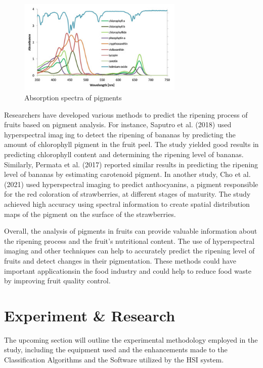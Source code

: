 \documentclass{article}
\begin{document}
{            \begin{figure}[h]
                \centering
                \includegraphics[width=0.7\textwidth]{Figures/pigmentWav.PNG}
                \caption{ Absorption spectra of pigments}
                \label{fig:my_label}
            \end{figure}
            
            \vspace*{1\baselineskip}
            Researchers have developed various methods to predict the ripening process of fruits based on pigment analysis. For instance, Saputro et al. (2018) used hyperspectral imaging to detect the ripening of bananas by predicting the amount of chlorophyll pigment in the fruit peel. The study yielded good results in predicting chlorophyll content and determining the ripening level of bananas. Similarly, Permata et al. (2017) reported similar results in predicting the ripening level of bananas by estimating carotenoid pigment. In another study, Cho et al. (2021) used hyperspectral imaging to predict anthocyanins, a pigment responsible for the red coloration of strawberries, at different stages of maturity. The study achieved high accuracy using spectral information to create spatial distribution maps of the pigment on the surface of the strawberries.\par
            Overall, the analysis of pigments in fruits can provide valuable information about the ripening process and the fruit’s nutritional content. The use of hyperspectral imaging and other techniques can help to accurately predict the ripening level of fruits and detect changes in their pigmentation. These methods could have important applicationsin the food industry and could help to reduce food waste by improving fruit quality control.
            \newpage
        \section{Experiment \& Research}
            \setcounter{figure}{0}
            The upcoming section will outline the experimental methodology employed in the study, including the equipment used and the enhancements made to the Classification Algorithms and the Software utilized by the HSI system.
}
\end{document}
